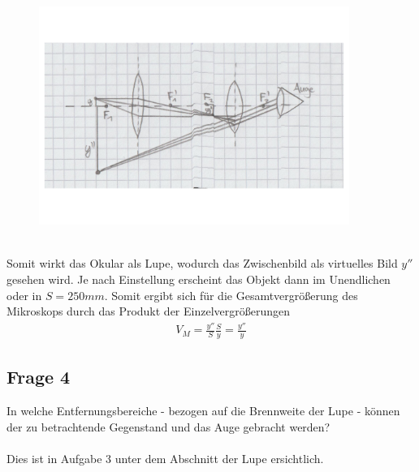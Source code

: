 \documentclass[a4paper,10pt]{scrartcl}
\begin{document}
			\\
	\begin{figure}[h]
\centering
\includegraphics[width=0.9\textwidth]{./Bilder/og7}
\end{figure}
\FloatBarrier			\\
			Somit wirkt das Okular als Lupe, wodurch das Zwischenbild als virtuelles Bild \(y''\) gesehen wird. Je nach Einstellung erscheint das Objekt dann im Unendlichen oder in \(S=250mm\). Somit ergibt sich für die Gesamtvergrößerung des Mikroskops durch das Produkt der Einzelvergrößerungen
			\begin{align*}
			V_{M}=\frac{y''}{S}\frac{S}{y}=\frac{y''}{y}
			\end{align*}
			
			\newpage
			
		\subsection{Frage 4}
			In welche Entfernungsbereiche - bezogen auf die Brennweite der Lupe - können der zu betrachtende
			Gegenstand und das Auge gebracht werden?\\
			\\
			Dies ist in Aufgabe 3 unter dem Abschnitt der Lupe ersichtlich.
			
\end{document}
